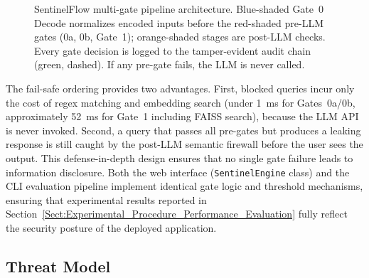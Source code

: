 \documentclass[journal]{IEEEtran}
\begin{document}
\begin{figure}[!ht]
\caption{SentinelFlow multi-gate pipeline architecture. Blue-shaded Gate~0 Decode normalizes encoded inputs before the red-shaded pre-LLM gates (0a, 0b, Gate~1); orange-shaded stages are post-LLM checks. Every gate decision is logged to the tamper-evident audit chain (green, dashed). If any pre-gate fails, the LLM is never called.}
\label{fig:architecture}
\end{figure}

The fail-safe ordering provides two advantages. First, blocked queries incur only the cost of regex matching and embedding search (under 1~ms for Gates~0a/0b, approximately 52~ms for Gate~1 including FAISS search), because the LLM API is never invoked. Second, a query that passes all pre-gates but produces a leaking response is still caught by the post-LLM semantic firewall before the user sees the output. This defense-in-depth design ensures that no single gate failure leads to information disclosure. Both the web interface (\texttt{SentinelEngine} class) and the CLI evaluation pipeline implement identical gate logic and threshold mechanisms, ensuring that experimental results reported in Section~\ref{Sect:Experimental_Procedure_Performance_Evaluation} fully reflect the security posture of the deployed application.

\subsection{Threat Model}
\label{Sect:Threat_Model}
\end{document}
